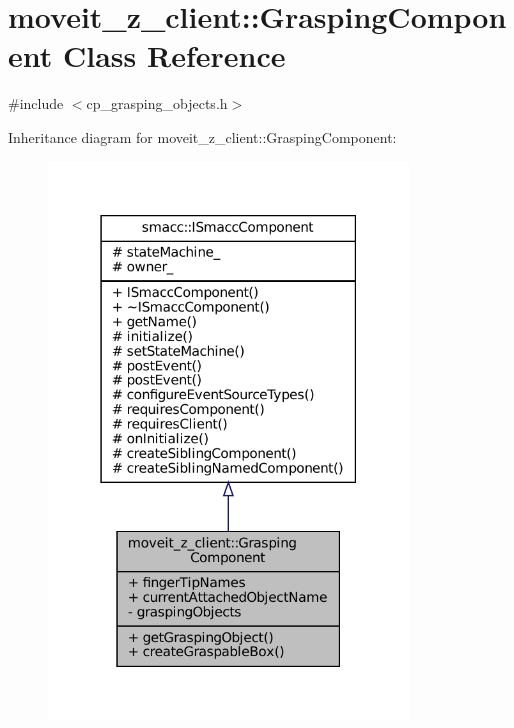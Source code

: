 \hypertarget{classmoveit__z__client_1_1GraspingComponent}{}\section{moveit\+\_\+z\+\_\+client\+:\+:Grasping\+Component Class Reference}
\label{classmoveit__z__client_1_1GraspingComponent}


{\ttfamily \#include $<$cp\+\_\+grasping\+\_\+objects.\+h$>$}



Inheritance diagram for moveit\+\_\+z\+\_\+client\+:\+:Grasping\+Component\+:
\nopagebreak
\begin{figure}[H]
\begin{center}
\leavevmode
\includegraphics[width=271pt]{classmoveit__z__client_1_1GraspingComponent__inherit__graph}
\end{center}
\end{figure}


